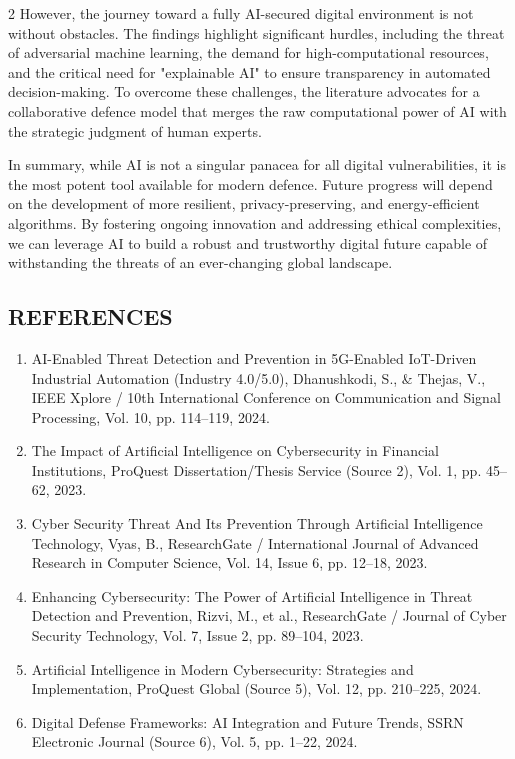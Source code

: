 \begin{multicols}{2}
  \noindent
  However, the journey toward a fully AI-secured digital environment is not without obstacles. The findings highlight significant hurdles, including the threat of adversarial machine learning, the demand for high-computational resources, and the critical need for "explainable AI" to ensure transparency in automated decision-making. To overcome these challenges, the literature advocates for a collaborative defence model that merges the raw computational power of AI with the strategic judgment of human experts.

  \noindent
  In summary, while AI is not a singular panacea for all digital vulnerabilities, it is the most potent tool available for modern defence. Future progress will depend on the development of more resilient, privacy-preserving, and energy-efficient algorithms. By fostering ongoing innovation and addressing ethical complexities, we can leverage AI to build a robust and trustworthy digital future capable of withstanding the threats of an ever-changing global landscape.

  \subsection*{\centering\uppercase{REFERENCES}}
  \begin{enumerate}
    \item AI-Enabled Threat Detection and Prevention in 5G-Enabled IoT-Driven Industrial Automation (Industry 4.0/5.0), Dhanushkodi, S., \& Thejas, V., IEEE Xplore / 10th International Conference on Communication and Signal Processing, Vol. 10, pp. 114–119, 2024.
    \item The Impact of Artificial Intelligence on Cybersecurity in Financial Institutions, ProQuest Dissertation/Thesis Service (Source 2), Vol. 1, pp. 45–62, 2023.
    \item Cyber Security Threat And Its Prevention Through Artificial Intelligence Technology, Vyas, B., ResearchGate / International Journal of Advanced Research in Computer Science, Vol. 14, Issue 6, pp. 12–18, 2023.
    \item Enhancing Cybersecurity: The Power of Artificial Intelligence in Threat Detection and Prevention, Rizvi, M., et al., ResearchGate / Journal of Cyber Security Technology, Vol. 7, Issue 2, pp. 89–104, 2023.
    \item Artificial Intelligence in Modern Cybersecurity: Strategies and Implementation, ProQuest Global (Source 5), Vol. 12, pp. 210–225, 2024.
    \item Digital Defense Frameworks: AI Integration and Future Trends, SSRN Electronic Journal (Source 6), Vol. 5, pp. 1–22, 2024.
  \end{enumerate}

\end{multicols}